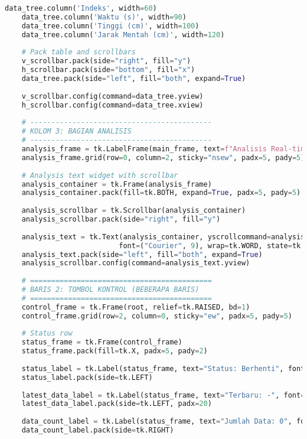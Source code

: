 \begin{itemize}
\begin{scriptsize}
\begin{lstlisting}[language=python]
    data_tree.column('Indeks', width=60)
    data_tree.column('Waktu (s)', width=90)
    data_tree.column('Tinggi (cm)', width=100)
    data_tree.column('Jarak Mentah (cm)', width=120)
    
    # Pack table and scrollbars
    v_scrollbar.pack(side="right", fill="y")
    h_scrollbar.pack(side="bottom", fill="x")
    data_tree.pack(side="left", fill="both", expand=True)
    
    v_scrollbar.config(command=data_tree.yview)
    h_scrollbar.config(command=data_tree.xview)
    
    # -------------------------------------------
    # KOLOM 3: BAGIAN ANALISIS
    # -------------------------------------------
    analysis_frame = tk.LabelFrame(main_frame, text=f"Analisis Real-time & Hasil Koefisien - {selected_ball_type}", font=("Arial", 12, "bold"))
    analysis_frame.grid(row=0, column=2, sticky="nsew", padx=5, pady=5)
    
    # Analysis text widget with scrollbar
    analysis_container = tk.Frame(analysis_frame)
    analysis_container.pack(fill=tk.BOTH, expand=True, padx=5, pady=5)
    
    analysis_scrollbar = tk.Scrollbar(analysis_container)
    analysis_scrollbar.pack(side="right", fill="y")
    
    analysis_text = tk.Text(analysis_container, yscrollcommand=analysis_scrollbar.set,
                           font=("Courier", 9), wrap=tk.WORD, state=tk.DISABLED)
    analysis_text.pack(side="left", fill="both", expand=True)
    analysis_scrollbar.config(command=analysis_text.yview)
    
    # ===========================================
    # BARIS 2: TOMBOL KONTROL (BEBERAPA BARIS)
    # ===========================================
    control_frame = tk.Frame(root, relief=tk.RAISED, bd=1)
    control_frame.grid(row=2, column=0, sticky="ew", padx=5, pady=5)
    
    # Status row
    status_frame = tk.Frame(control_frame)
    status_frame.pack(fill=tk.X, padx=5, pady=2)
    
    status_label = tk.Label(status_frame, text="Status: Berhenti", font=("Arial", 14, "bold"))
    status_label.pack(side=tk.LEFT)
    
    latest_data_label = tk.Label(status_frame, text="Terbaru: -", font=("Arial", 12))
    latest_data_label.pack(side=tk.LEFT, padx=20)
    
    data_count_label = tk.Label(status_frame, text="Jumlah Data: 0", font=("Arial", 12))
    data_count_label.pack(side=tk.RIGHT)
    

\end{lstlisting}
\end{scriptsize}
\end{itemize}
